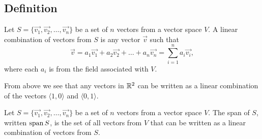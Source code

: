 \subsection{Definition}
\begin{definition}
	Let $S = \{\vec{v_1}, \vec{v_2}, \dots, \vec{v_n}\}$ be a set of $n$ vectors from a vector space $V$.
	A linear combination of vectors from $S$ is any vector $\vec{v}$ such that
	\begin{equation*}
		\vec{v} = a_1\vec{v_1} + a_2\vec{v_2} + \dots + a_n\vec{v_n} = \sum_{i=1}^{n}{a_i\vec{v_i}},
	\end{equation*}
	where each $a_i$ is from the field associated with $V$.
\end{definition}

From above we see that any vectors in $\mathbb{R}^2$ can be written as a linear combination of the vectors $\langle 1, 0 \rangle$ and $\langle 0, 1 \rangle$.

\begin{definition}
	Let $S = \{\vec{v_1}, \vec{v_2}, \dots, \vec{v_n}\}$ be a set of $n$ vectors from a vector space $V$.
	The span of $S$, written $\operatorname{span}{S}$, is the set of all vectors from $V$ that can be written as a linear combination of vectors from $S$.
\end{definition}

